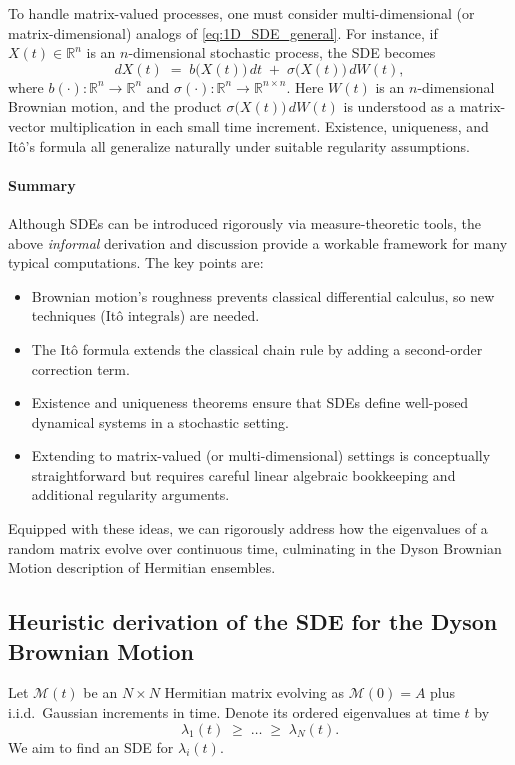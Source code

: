\documentclass[letterpaper,11pt,oneside,reqno]{article}
\numberwithin{equation}{section}
\theoremstyle{definition}
\begin{document}
\medskip
To handle matrix-valued processes, one must consider multi-dimensional (or matrix-dimensional) analogs of \eqref{eq:1D_SDE_general}. For instance, if \(X(t)\in\mathbb{R}^n\) is an \(n\)-dimensional stochastic process, the SDE becomes
\[
dX(t)
\;=\;
b\bigl(X(t)\bigr)\,dt
\;+\;
\sigma\bigl(X(t)\bigr)\,dW(t),
\]
where \(b(\cdot)\colon\mathbb{R}^n\to\mathbb{R}^n\) and \(\sigma(\cdot)\colon\mathbb{R}^n\to \mathbb{R}^{n\times n}\). Here \(W(t)\) is an \(n\)-dimensional Brownian motion, and the product \(\sigma\bigl(X(t)\bigr)\,dW(t)\) is understood as a matrix-vector multiplication in each small time increment. Existence, uniqueness, and It\^{o}’s formula all generalize naturally under suitable regularity assumptions.

\paragraph{Summary}
Although SDEs can be introduced rigorously via measure-theoretic tools, the above \emph{informal} derivation and discussion provide a workable framework for many typical computations. The key points are:
\begin{itemize}
\item Brownian motion’s roughness prevents classical differential calculus, so new techniques (It\^{o} integrals) are needed.
\item The It\^{o} formula extends the classical chain rule by adding a second-order correction term.
\item Existence and uniqueness theorems ensure that SDEs define well-posed dynamical systems in a stochastic setting.
\item Extending to matrix-valued (or multi-dimensional) settings is conceptually straightforward but requires careful linear algebraic bookkeeping and additional regularity arguments.
\end{itemize}
Equipped with these ideas, we can rigorously address how the eigenvalues of a random matrix evolve over continuous time, culminating in the Dyson Brownian Motion description of Hermitian ensembles.

\subsection{Heuristic derivation of the SDE for the Dyson Brownian Motion}


Let $\mathcal{M}(t)$ be an $N\times N$ Hermitian matrix evolving as $\mathcal{M}(0)=A$ plus i.i.d.\ Gaussian increments in time. Denote its ordered eigenvalues at time $t$ by
\[
\lambda_1(t)\;\ge\;\dots\;\ge\;\lambda_N(t).
\]
We aim to find an SDE for $\lambda_i(t)$.
\end{document}
